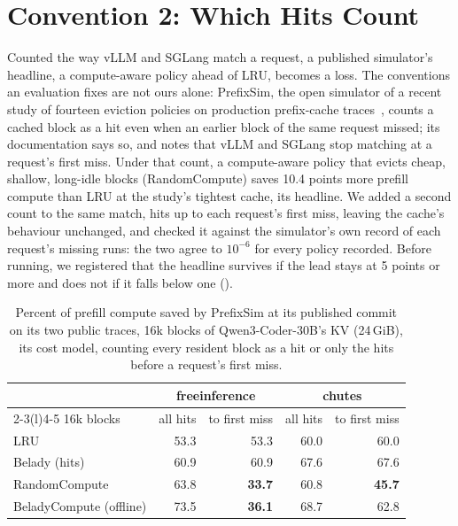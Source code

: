 \section{Convention 2: Which Hits Count}
\label{sec:matching}
Counted the way vLLM and SGLang match a request, a published simulator's headline, a compute-aware policy
ahead of LRU, becomes a loss. The conventions an evaluation fixes are not ours alone: PrefixSim, the open simulator of a recent study of
fourteen eviction policies on production prefix-cache traces~\cite{liu2026fancyeviction}, counts a cached
block as a hit even when an earlier block of the same request missed; its documentation says so, and notes
that vLLM and SGLang stop matching at a request's first miss. Under that count, a compute-aware policy that
evicts cheap, shallow, long-idle blocks (RandomCompute) saves 10.4 points more prefill compute than LRU at the
study's tightest cache, its headline. We added a second count to the same match, hits up to each request's
first miss, leaving the cache's behaviour unchanged, and checked it against the simulator's own record of each
request's missing runs: the two agree to $10^{-6}$ for every policy recorded. Before running, we registered
that the headline survives if the lead stays at 5 points or more and does not if it falls below one
().

\begin{table}[t]
\centering\footnotesize\setlength{\tabcolsep}{3.5pt}
\begin{tabular}{@{}lrrrr@{}}
\toprule
& \multicolumn{2}{c}{freeinference} & \multicolumn{2}{c}{chutes} \\
\cmidrule(lr){2-3}\cmidrule(l){4-5}
16k blocks & all hits & to first miss & all hits & to first miss \\
\midrule
LRU & 53.3 & 53.3 & 60.0 & 60.0 \\
Belady (hits) & 60.9 & 60.9 & 67.6 & 67.6 \\
RandomCompute & 63.8 & \textbf{33.7} & 60.8 & \textbf{45.7} \\
BeladyCompute (offline) & 73.5 & \textbf{36.1} & 68.7 & 62.8 \\
\bottomrule
\end{tabular}
\caption{Percent of prefill compute saved by PrefixSim at its published commit on its two public traces,
16k blocks of Qwen3-Coder-30B's KV (24\,GiB), its cost model, counting every resident block as a hit or
only the hits before a request's first miss.}
\label{tab:matching}
\end{table}

